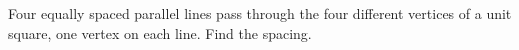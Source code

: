 Four equally spaced parallel lines pass through the four different vertices of a unit square, one vertex on each line. Find the spacing.
